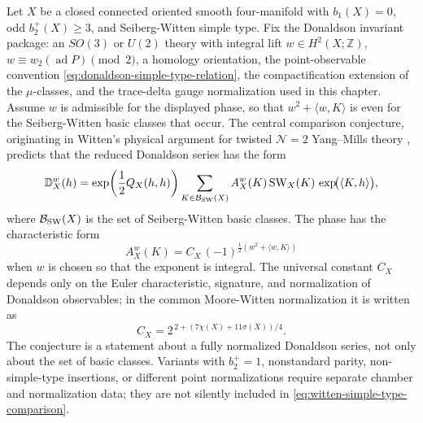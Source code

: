 \begin{conjecture}
\label{hyp:witten-simple-type-comparison-datum}
Let \(X\) be a closed connected oriented smooth four-manifold with
\(b_1(X)=0\), odd \(b_2^+(X)\ge3\), and Seiberg-Witten simple type.  Fix the
Donaldson invariant package: an \(SO(3)\) or \(U(2)\) theory with integral lift
\(w\in H^2(X;\mathbb Z)\), \(w\equiv w_2(\operatorname{ad}P)\pmod2\), a
homology orientation, the point-observable convention
\eqref{eq:donaldson-simple-type-relation}, the compactification extension of
the \(\mu\)-classes, and the trace-delta gauge normalization used in this
chapter.  Assume \(w\) is admissible for the displayed phase, so that
\(w^2+\langle w,K\rangle\) is even for the Seiberg-Witten basic classes that
occur.  The central comparison conjecture, originating in Witten's physical
argument for twisted \(\mathcal N=2\) Yang--Mills theory
\cite{Witten1994MonopolesFourManifolds}, predicts that the reduced Donaldson
series has the form
\begin{equation}
  \mathbb D_X^w(h)
  =
  \exp\!\left(\frac{1}{2}Q_X(h,h)\right)
  \sum_{K\in\mathcal B_{\rm SW}(X)}
  A_X^w(K)\,
  {\rm SW}_X(K)\,
  \exp\!\bigl(\langle K,h\rangle\bigr),
  \label{eq:witten-simple-type-comparison}
\end{equation}
where \(\mathcal B_{\rm SW}(X)\) is the set of Seiberg-Witten basic classes.
The phase has the characteristic form
\begin{equation}
  A_X^w(K)
  =
  C_X\,
  (-1)^{\frac{1}{2}(w^2+\langle w,K\rangle)}
  \label{eq:witten-comparison-phase}
\end{equation}
when \(w\) is chosen so that the exponent is integral.  The universal
constant \(C_X\) depends only on the Euler characteristic, signature, and
normalization of Donaldson observables; in the common Moore-Witten
normalization it is written as
\begin{equation}
  C_X=2^{\,2+(7\chi(X)+11\sigma(X))/4}.
  \label{eq:moore-witten-common-constant}
\end{equation}
The conjecture is a statement about a fully normalized Donaldson series, not
only about the set of basic classes.  Variants with \(b_2^+=1\), nonstandard
parity, non-simple-type insertions, or different point normalizations require
separate chamber and normalization data; they are not silently included in
\eqref{eq:witten-simple-type-comparison}.
\end{conjecture}


